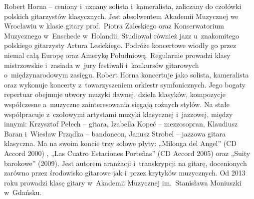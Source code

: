 \documentclass[twoside,a4page]{article}
\begin{document}
Robert Horna – ceniony i~uznany solista i~kameralista, zaliczany do
czołówki polskich gitarzystów klasycznych. Jest absolwentem Akademii
Muzycznej we Wrocławiu w klasie gitary prof.~Piotra Zaleskiego oraz
Konserwatorium Muzycznego w~Enschede w~Holandii. Studiował również
jazz u~znakomitego polskiego gitarzysty Artura Lesickiego. Podróże
koncertowe wiodły go przez niemal całą Europę oraz Amerykę
Południową. Regularnie prowadzi klasy mistrzowskie i~zasiada w~jury
festiwali i~konkursów gitarowych o~międzynarodowym zasięgu. Robert
Horna koncertuje jako solista, kameralista oraz wykonuje koncerty
z~towarzyszeniem orkiestr symfonicznych. Jego bogaty repertuar obejmuje
utwory muzyki dawnej, dzieła klasyków, kompozycje współczesne
a~muzyczne zainteresowania sięgają rożnych stylów. Na stałe współpracuje
z~czołowymi artystami muzyki klasycznej i~jazzowej, między innymi:
Krzysztof Pełech – gitara, Izabella Kopeć – mezzosopran, Klaudiusz
Baran i~Wiesław Prządka – bandoneon, Janusz Strobel – jazzowa gitara
klasyczna. Ma na swoim koncie trzy solowe płyty: „Milonga del Angel”
(CD Accord 2000) , „Las Cuatro Estaciones Porteñas” (CD Accord 2005)
oraz „Suity barokowe” (2009). Jest autorem aranżacji i~transkrypcji na
gitarę, docenionych zarówno przez środowisko gitarowe jak i~przez
krytyków muzycznych. Od 2013 roku prowadzi klasę gitary w~Akademii
Muzycznej im.~Stanisława Moniuszki w~Gdańsku.
\end{document}
